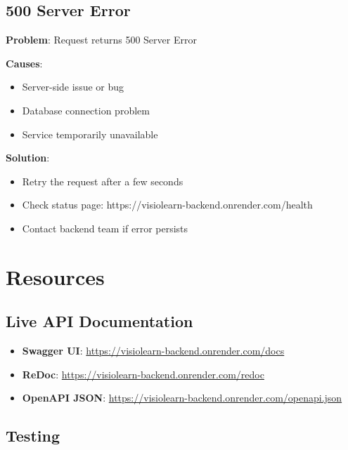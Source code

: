 \documentclass[12pt,a4paper,oneside]{article}
\begin{document}
\subsection{500 Server Error}

\begin{tcolorbox}[colback=lightred, colframe=darkblue]
\textbf{Problem}: Request returns 500 Server Error

\textbf{Causes}:
\begin{itemize}
    \item Server-side issue or bug
    \item Database connection problem
    \item Service temporarily unavailable
\end{itemize}

\textbf{Solution}:
\begin{itemize}
    \item Retry the request after a few seconds
    \item Check status page: https://visiolearn-backend.onrender.com/health
    \item Contact backend team if error persists
\end{itemize}
\end{tcolorbox}

\newpage

\section{Resources}

\subsection{Live API Documentation}

\begin{itemize}
    \item \textbf{Swagger UI}: \url{https://visiolearn-backend.onrender.com/docs}
    \item \textbf{ReDoc}: \url{https://visiolearn-backend.onrender.com/redoc}
    \item \textbf{OpenAPI JSON}: \url{https://visiolearn-backend.onrender.com/openapi.json}
\end{itemize}

\subsection{Testing}
\end{document}

